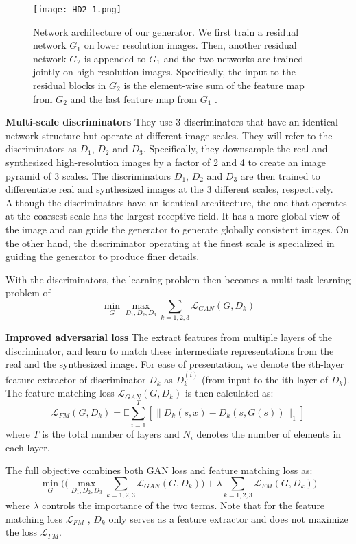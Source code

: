 \documentclass[10pt,twocolumn,letterpaper]{article}
\begin{document}
\begin{figure*}
	\begin{center}
		\texttt{[image: HD2\_1.png]}
	\end{center}
	\caption{Network architecture of our generator. We first train a residual network $G_1$ on lower resolution images. Then, another residual network $G_2$ is appended to $G_1$ and the two networks are trained jointly on high resolution images. Specifically, the input to the residual blocks in $G_2$ is the element-wise sum of the feature map from $G_2$ and the last feature map from $G_1$ .~\cite{TC2018High}}
	\label{fig:HD2_1}
\end{figure*}

\textbf{Multi-scale discriminators} They use 3 discriminators that have an identical network structure but operate at different image scales. They will refer to the discriminators as $D_1$, $D_2$ and $D_3$. Specifically, they downsample the real and synthesized high-resolution images by a factor of 2 and 4 to create an image pyramid of 3 scales. The discriminators $D_1$, $D_2$ and $D_3$ are then trained to differentiate real and synthesized images at the 3 different scales, respectively. Although the discriminators have an identical architecture, the one that operates at the coarsest scale has the largest receptive field. It has a more global view of the image and can guide the generator to generate globally consistent images. On the other hand, the discriminator operating at the finest scale is specialized in guiding the generator to produce finer details.\par
With the discriminators, the learning problem then becomes a multi-task learning problem of
\begin{equation}
\min_G\max_{D_1,D_2,D_3}\sum_{k=1,2,3}\mathcal{L}_{GAN}(G,D_k)
\end{equation}\par
\textbf{Improved adversarial loss} The extract features from multiple layers of the discriminator, and learn to match these intermediate representations from the real and the synthesized image. For ease of presentation, we denote the $i$th-layer feature extractor of discriminator $D_k$ as $D_k^{(i)}$ (from input to the ith layer of $D_k$). The feature matching loss $\mathcal{L}_{GAN}(G,D_k)$ is then calculated as:
\begin{equation}
\mathcal{L}_{FM}(G,D_k)=\mathbb{E}\sum_{i=1}^{T}[\|D_k(s,x)−D_k(s,G(s))\|_1]
\end{equation}
where $T$ is the total number of layers and $N_i$ denotes the
number of elements in each layer.\par
The full objective combines both GAN loss and feature matching loss as:
\begin{equation}
\min_G\bigg (\big (\max_{D_1,D_2,D_3}\sum_{k=1,2,3}\mathcal{L}_{GAN}(G,D_k)\big )+\lambda\sum_{k=1,2,3}\mathcal{L}_{FM}(G,D_k)\bigg )
\end{equation}
where $\lambda$ controls the importance of the two terms. Note that for the feature matching loss $\mathcal{L}_{FM}$ , $D_k$ only serves as a feature extractor and does not maximize the loss $\mathcal{L}_{FM}$.
\end{document}
